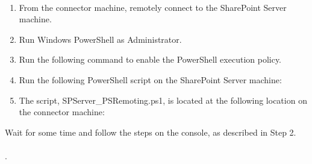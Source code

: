 \documentclass[letterpaper,10pt,english]{sphinxmanual}
\begin{document}
\paragraph{}
\label{\detokenize{mcdmp_app_ug:step-1}}
\begin{enumerate}
\item {} 
From the connector machine, remotely connect to the SharePoint Server machine.

\item {} 
Run Windows PowerShell as Administrator.

\item {} 
Run the following command to enable the PowerShell execution policy.

\end{enumerate}
\begin{quote}

\end{quote}
\begin{enumerate}
\setcounter{enumi}{3}
\item {} 
Run the following PowerShell script on the SharePoint Server machine:

\end{enumerate}
\begin{quote}

\end{quote}
\begin{enumerate}
\setcounter{enumi}{4}
\item {} 
The script, SPServer\_PSRemoting.ps1, is located at the following location on the connector machine:

\end{enumerate}
\begin{quote}

\end{quote}

Wait for some time and follow the steps on the console, as described in Step 2.


\paragraph{}
\label{\detokenize{mcdmp_app_ug:step-2}}
.
\end{document}
